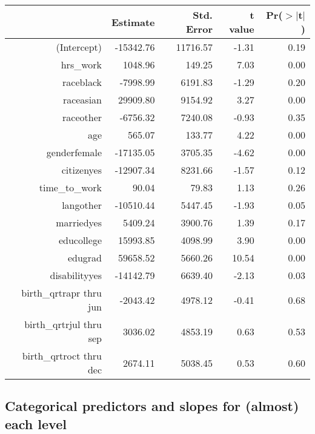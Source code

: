 \documentclass[11pt,containsverbatim,handout,xcolor=xelatex,dvipsnames,table]{beamer}
\begin{document}
\begin{frame}[shrink]


\begin{center}
{\tiny
\begin{tabular}{rrrrr}
  \hline
 & Estimate & Std. Error & t value & Pr($>$$|$t$|$) \\ 
  \hline
(Intercept) & -15342.76 & 11716.57 & -1.31 & 0.19 \\ 
  hrs\_work & 1048.96 & 149.25 & 7.03 & 0.00 \\ 
  raceblack & -7998.99 & 6191.83 & -1.29 & 0.20 \\ 
  raceasian & 29909.80 & 9154.92 & 3.27 & 0.00 \\ 
  raceother & -6756.32 & 7240.08 & -0.93 & 0.35 \\ 
  age & 565.07 & 133.77 & 4.22 & 0.00 \\ 
  genderfemale & -17135.05 & 3705.35 & -4.62 & 0.00 \\ 
  citizenyes & -12907.34 & 8231.66 & -1.57 & 0.12 \\ 
  time\_to\_work & 90.04 & 79.83 & 1.13 & 0.26 \\ 
  langother & -10510.44 & 5447.45 & -1.93 & 0.05 \\ 
  marriedyes & 5409.24 & 3900.76 & 1.39 & 0.17 \\ 
  educollege & 15993.85 & 4098.99 & 3.90 & 0.00 \\ 
  edugrad & 59658.52 & 5660.26 & 10.54 & 0.00 \\ 
  disabilityyes & -14142.79 & 6639.40 & -2.13 & 0.03 \\ 
  birth\_qrtrapr thru jun & -2043.42 & 4978.12 & -0.41 & 0.68 \\ 
  birth\_qrtrjul thru sep & 3036.02 & 4853.19 & 0.63 & 0.53 \\ 
  birth\_qrtroct thru dec & 2674.11 & 5038.45 & 0.53 & 0.60 \\ 
   \hline
\end{tabular}
}
\end{center}

\end{frame}


\subsection{Categorical predictors and slopes for (almost) each level}
\label{mi2}
\end{document}
